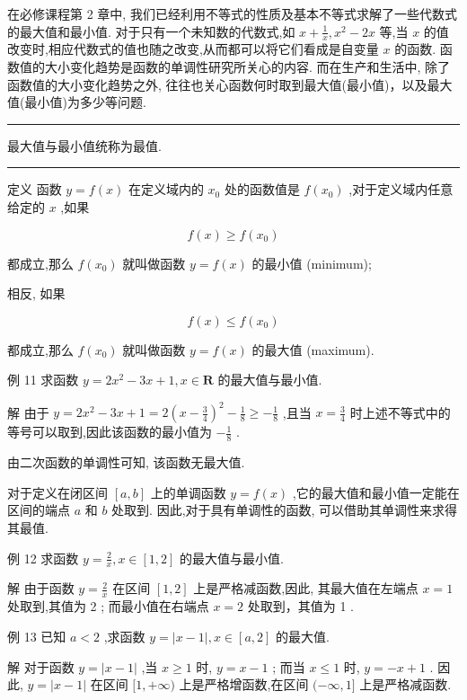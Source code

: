 \documentclass[10pt]{article}
\newcommand{\HRule}{\begin{center}\rule{0.9\linewidth}{0.2mm}\end{center}}
\begin{document}
在必修课程第 2 章中, 我们已经利用不等式的性质及基本不等式求解了一些代数式的最大值和最小值. 对于只有一个未知数的代数式,如 \(x + \frac{1}{x},{x}^{2} - {2x}\) 等,当 \(x\) 的值改变时,相应代数式的值也随之改变,从而都可以将它们看成是自变量 \(x\) 的函数. 函数值的大小变化趋势是函数的单调性研究所关心的内容. 而在生产和生活中, 除了函数值的大小变化趋势之外, 往往也关心函数何时取到最大值(最小值)，以及最大值(最小值)为多少等问题.

\HRule

最大值与最小值统称为最值.

\HRule

定义 函数 \(y = f\left( x\right)\) 在定义域内的 \({x}_{0}\) 处的函数值是 \(f\left( {x}_{0}\right)\) ,对于定义域内任意给定的 \(x\) ,如果

\[
f\left( x\right)  \geq  f\left( {x}_{0}\right)
\]

都成立,那么 \(f\left( {x}_{0}\right)\) 就叫做函数 \(y = f\left( x\right)\) 的最小值 (minimum);

相反, 如果

\[
f\left( x\right)  \leq  f\left( {x}_{0}\right)
\]

都成立,那么 \(f\left( {x}_{0}\right)\) 就叫做函数 \(y = f\left( x\right)\) 的最大值 (maximum).

例 11 求函数 \(y = 2{x}^{2} - {3x} + 1,x \in  \mathbf{R}\) 的最大值与最小值.

解 由于 \(y = 2{x}^{2} - {3x} + 1 = 2{\left( x - \frac{3}{4}\right) }^{2} - \frac{1}{8} \geq   - \frac{1}{8}\) ,且当 \(x = \frac{3}{4}\) 时上述不等式中的等号可以取到,因此该函数的最小值为 \(- \frac{1}{8}\) .

由二次函数的单调性可知, 该函数无最大值.

对于定义在闭区间 \(\left\lbrack  {a,b}\right\rbrack\) 上的单调函数 \(y = f\left( x\right)\) ,它的最大值和最小值一定能在区间的端点 \(a\) 和 \(b\) 处取到. 因此,对于具有单调性的函数, 可以借助其单调性来求得其最值.

例 12 求函数 \(y = \frac{2}{x},x \in  \left\lbrack  {1,2}\right\rbrack\) 的最大值与最小值.

解 由于函数 \(y = \frac{2}{x}\) 在区间 \(\left\lbrack  {1,2}\right\rbrack\) 上是严格减函数,因此, 其最大值在左端点 \(x = 1\) 处取到,其值为 2 ; 而最小值在右端点 \(x = 2\) 处取到，其值为 1 .

例 13 已知 \(a < 2\) ,求函数 \(y = \left| {x - 1}\right| ,x \in  \left\lbrack  {a,2}\right\rbrack\) 的最大值.

解 对于函数 \(y = \left| {x - 1}\right|\) ,当 \(x \geq  1\) 时, \(y = x - 1\) ; 而当 \(x \leq  1\) 时, \(y =  - x + 1\) . 因此, \(y = \left| {x - 1}\right|\) 在区间 \(\lbrack 1, + \infty )\) 上是严格增函数,在区间 \(( - \infty ,1\rbrack\) 上是严格减函数.
\end{document}
